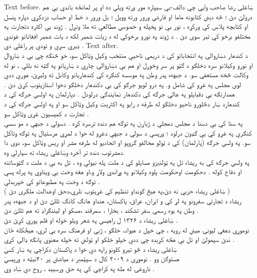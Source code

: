 \documentclass[a4paper]{article}
\begin{document}
Text before. \texturdu{ښاغلی رشا صاحب وايي چي دالف-بې سېپاره مور ورته ویلې ده او پر لمانځه باندي یې هم درولئ دئ ؛ څه دېني کتابونه ماما او فارسي ورور ورته وويل ؛ بل ورور د خط او حساب دزدکړي دپاره پنسل او کتابچه پلاس کي ورکړه ، نور یې نو پخپله و خصوصي مطالعې ته ملا وتړل . ژوند یې اکثره دتجارت په مختلفو برخو کي تېر سوی دئ . د ژوند په نورو برخوکي له د زيات شمېر لکه د يات شمېر افغانانو غوندي ډیري سړې و تودې پر راغلي دي .} Text after.
\\
\texturdu{ د کندهار دښاروالۍ په انتخاباتو کي د دریمي ناحیې منتخب وکیل وټاکل سو، خو څنګه چي یې د ښاروال او نورو وکیلانو سره دخلګو د ګټو پر سر وخوړل او هم یې دښاروالۍ چاري د ښاریانو په ګټه نه بللې ، نو له وکالت څخه مستعفي سو. د جبههء پدر وطن په مو‌سسه کنګره کي کندهاریانو وکابل ته ولېږئ، هورې ددې لوی مجلس په غړو کي شامل و. په درو لویو جرګو کي یې دکندهار دخلګو دخوا استازيتوب کړئ دئ . همدارنګه یې دقبایلو په عالي جرګه کي دکندهار نمایندګي درلودل . دپارلمان په اولسي جرګه کي د کندهارد ښار دڅلورو ناحیو دخلګو له طرفه د رایو په اکثریت وکیل وټاکل سو او په اولسي جرګه کي د تجارت د کمیسیون غړی وټاکل سو .
 }\\

\texturdu{ په سنا کي یې دسنا د مجلس دمجلې د ژباړن په توګه هم دنده ترسره کړه . دسولي د جبهې د مو سسې کنګرې په غړو کي یې ګډون درلود ؛ ورپسې د سولي د جبهې دغړو له خوا د لمړي مرستيال په توګه وتاکل سو. په ولسي جرګه (پارلمان) کي د ټولو مخالفو ګروپو او اتحادیو له طرفه مشر او ریس وټاکل سو، دوی دا دمشرتوب دنده تر آخره وښاغلي ریشاء ته سپارلې وه.}
\\
\texturdu{ په ولسي جرګه کي به ریشاء تل په ټولنيزو مسایلو کي د ملت پله نیولې وه ، تل به یې د ملت د ګټوساتنه او دفاع کوله . دحکومت اوحکومت پلوه وکیلانو په وړاندي ولاړ و،او هغه وخت يې ويناوي په پرله پسې توګه د وخت په مطبوعاتو کي خپرېدلې .
}\\

\texturdu{ ( ښاغلی ریشاء حزبي نه دئ،په هیڅ ګونداو تنظیم کي غړیتوب نلري،دحق اوعدالت ملګری دئ ) }
\\
\texturdu{ ریشاء د تجارتي سفرونو په لړ کي و ایران، عراق، پاکستان، هنداو هانګ کانګ تللئ دئ او د جبههء پدر وطن په یوه رسمي سفر تشکند ، بخارا ، سمرقند ،مسکو او لیننګراډ ته هم تللئ دئ . }
\\
\texturdu{ ښاغلی ریشاء د ۱۳۲۶ ل راهیسي په شعر ویلو خوله او قلم پوري کړئ دئ . }
\\
\texturdu{ نوموړي دهغي لیونۍ میني له رویه ، چي خپل د هیواد، خلګو ، ژبي او فرهنګ سره یې لري، هیڅکله ځان ندئ سپمولئ او تل يې هڅه کړېده چي ددې خپلو خلکو او ټولني ته خپله معنوي پانګه ډالۍ کړي .}
\\
\texturdu{ښاغلی ريشاء د څو تېرو کلونو راپه دې خوا د پاکستان دکراچي په ښار کښي}\\
\texturdu{هستوګن وو . نوموړی د ۲۰۰۹ کال د سپټمبر د مياشتي پر ۲۰نېټه د ورپېښي}\\
\texturdu{ناروغۍ له مله په کراچي کې په حق ورسيېد ، روح دې ښاد وي .}\\
\end{document}
